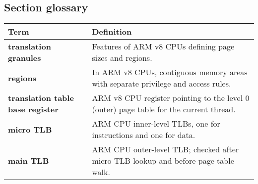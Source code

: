\subsection*{Section glossary}
\begin{tabular}{p{}p{}}
\toprule
\textbf{Term} & \textbf{Definition} \\
\midrule
\textbf{translation granules} & Features of ARM v8 CPUs defining page sizes and regions. \\
\textbf{regions} & In ARM v8 CPUs, contiguous memory areas with separate privilege and access rules. \\
\textbf{translation table base register} & ARM v8 CPU register pointing to the level 0 (outer) page table for the current thread. \\
\textbf{micro TLB} & ARM CPU inner-level TLBs, one for instructions and one for data. \\
\textbf{main TLB} & ARM CPU outer-level TLB; checked after micro TLB lookup and before page table walk. \\
\bottomrule
\end{tabular}
